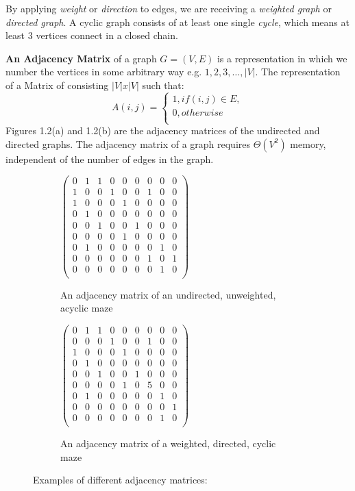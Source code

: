By applying \textit{weight} or \textit{direction} to edges, we are receiving a \textit{ weighted graph} or \textit{directed graph}. A cyclic graph consists of at least one single \textit{cycle}, which means at least 3 vertices connect in a closed chain. 
\newline
\begin{definition} \textbf{An Adjacency Matrix } of a graph $G=(V, E)$ is a representation in which we number the vertices in some arbitrary way e.g. $1,2,3,\dots, |V|$. The representation of a Matrix of
consisting $|V|x|V|$ such that: 
$$A(i,j)=
\begin{cases}
1, if (i,j)\in E,\\
0, otherwise\\
\end{cases}$$
Figures 1.2(a) and 1.2(b) are the adjacency matrices of the undirected and directed graphs.
The adjacency matrix of a graph requires $\varTheta(V^2)$ memory, independent of the number of edges in the graph.
\end{definition}
\begin{figure}[h]
	\centering
	\begin{subfigure}{.35\textwidth}
	  \centering
	  $\begin{pmatrix}
		0&1&1&0&0&0&0&0&0\\
		1&0&0&1&0&0&1&0&0\\
		1&0&0&0&1&0&0&0&0\\
		0&1&0&0&0&0&0&0&0\\
		0&0&1&0&0&1&0&0&0\\
		0&0&0&0&1&0&0&0&0\\
		0&1&0&0&0&0&0&1&0\\
		0&0&0&0&0&0&1&0&1\\
		0&0&0&0&0&0&0&1&0\\
	\end{pmatrix}$
	  \caption{An adjacency matrix of an undirected, unweighted, acyclic maze}
	  \label{fig:sub1}
	\end{subfigure}
	\begin{subfigure}{.35\textwidth}
	  \centering
	  $\begin{pmatrix}
		0&1&1&0&0&0&0&0&0\\
		0&0&0&1&0&0&1&0&0\\
		1&0&0&0&1&0&0&0&0\\
		0&1&0&0&0&0&0&0&0\\
		0&0&1&0&0&1&0&0&0\\
		0&0&0&0&1&0&5&0&0\\
		0&1&0&0&0&0&0&1&0\\
		0&0&0&0&0&0&0&0&1\\
		0&0&0&0&0&0&0&1&0\\
	\end{pmatrix}$
	  \caption{An adjacency matrix of a weighted, directed, cyclic maze}
	  \label{fig:sub2}
	\end{subfigure}
	\caption{Examples of different adjacency matrices:}
	\label{fig:test}
\end{figure}

